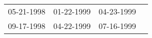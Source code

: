 \begin{supertabular}{llll}
 05-21-1998 &  01-22-1999 &  04-23-1999 \\
 09-17-1998 &  04-22-1999 &  07-16-1999 \\
\end{supertabular}
